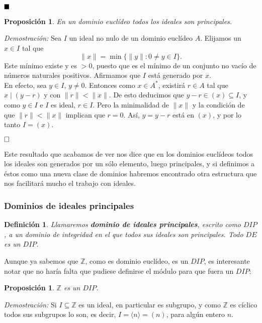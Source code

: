 \documentclass[12pt]{article}
\newtheorem{proposition}[theorem]{Proposición}
\newtheorem{definition}[theorem]{Definición}
\providecommand{\norm}[1]{\lVert#1\rVert}
\begin{document}
$\hfill \blacksquare$

\begin{proposition}\label{eq:dedip} En un dominio euclídeo todos los ideales son principales.
\end{proposition}
\emph{Demostración: } Sea $I$ un ideal no nulo de un dominio euclídeo $A$. Elijamos un $x \in I$ tal que $$\norm{x} = \min \lbrace \norm{y} :0 \neq y \in I \rbrace.$$ Este mínimo existe y es $>0$, puesto que es el mínimo de un conjunto no vacío de números naturales positivos. Afirmamos que $I$ está generado por $x$.\vspace{0.2cm}\\
En efecto, sea $y \in I$, $y \neq 0$. Entonces como $x \in A^{\ast}$, existirá $r \in A$ tal que $x \mid (y-r)$ y con $\norm{r} < \norm{x}$. De esto deducimos que $y-r \in (x) \subseteq I$, y como $y \in I$ e $I$ es ideal, $r \in I$. Pero la minimalidad de $\norm{x}$ y la condición de que $\norm{r} < \norm{x}$ implican que $r = 0$. Así, $y = y-r$ está en $(x)$, y por lo tanto $I = (x)$.

$\hfill \square$

Este resultado que acabamos de ver nos dice que en los dominios euclídeos todos los ideales son generados por un sólo elemento, luego principales, y si definimos a éstos como una nueva clase de dominios habremos encontrado otra estructura que nos facilitará mucho el trabajo con ideales. 

\subsubsection{Dominios de ideales principales}

\begin{definition} Llamaremos \textbf{dominio de ideales principales}, escrito como $DIP$, a un dominio de integridad en el que todos sus ideales son principales. Todo $DE$ es un $DIP$.
\end{definition} 

Aunque ya sabemos que $\mathbb{Z}$, como es dominio euclídeo, es un $DIP$, es interesante notar que no haría falta que pudiese definirse el módulo para que fuera un $DIP$:

\begin{proposition}$\mathbb{Z}$ es un $DIP$.
\end{proposition}
\emph{Demostración: }Si $I \subseteq \mathbb{Z}$ es un ideal, en particular es subgrupo, y como $\mathbb{Z}$ es cíclico todos sus subgrupos lo son, es decir, $I = \langle n \rangle = (n)$, para algún entero $n$. 
\end{document}
